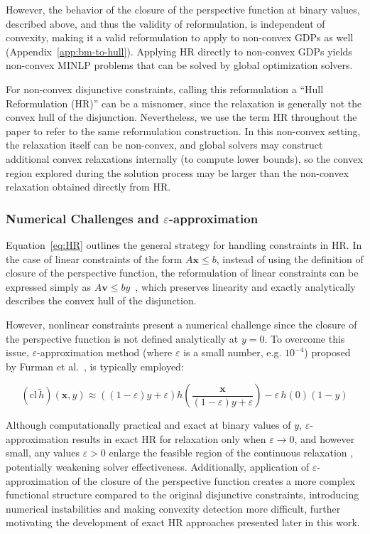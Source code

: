 \documentclass[11pt]{article}
\begin{document}
However, the behavior of the closure of the perspective function at binary values, described above, and thus the validity of reformulation, is independent of convexity, making it a valid reformulation to apply to non-convex GDPs as well (Appendix~\ref{app:bm-to-hull}).
Applying HR directly to non-convex GDPs yields non-convex MINLP problems that can be solved by global optimization solvers.


For non-convex disjunctive constraints, calling this reformulation a “Hull Reformulation (HR)” can be a misnomer, since the relaxation is generally not the convex hull of the disjunction.
Nevertheless, we use the term HR throughout the paper to refer to the same reformulation construction.
In this non-convex setting, the relaxation itself can be non-convex, and global solvers may construct additional convex relaxations internally (to compute lower bounds), so the convex region explored during the solution process may be larger than the non-convex relaxation obtained directly from HR.


\subsubsection{Numerical Challenges and $\varepsilon$-approximation}


Equation~\eqref{eq:HR} outlines the general strategy for handling constraints in HR.
In the case of linear constraints of the form \(A\mathbf{x}\leq b\), instead of using the definition of closure of the perspective function, the reformulation of linear constraints can be expressed simply as \(A\mathbf{v}\leq b y\)~\cite{balasDisjunctiveProgramming2018}, which preserves linearity and exactly analytically describes the convex hull of the disjunction.

However, nonlinear constraints present a numerical challenge since the closure of the perspective function is not defined analytically at \(y=0\).
To overcome this issue, \(\varepsilon\)-approximation method (where \(\varepsilon\) is a small number, e.g. \(10^{-4}\)) proposed by Furman et al.~\cite{furmanComputationallyUsefulAlgebraic2020}, is typically employed:

\begin{equation}
\left(\text{cl}\,\widetilde{h}\right)(\mathbf{x},y)\approx\left((1-\varepsilon)y+\varepsilon\right)h\left(\frac{\mathbf{x}}{(1-\varepsilon)y+\varepsilon}\right)-\varepsilon\,h(0)(1-y)
\label{eq:approx}
\end{equation}


Although computationally practical and exact at binary values of $y$, $\varepsilon$-approximation results in exact HR for relaxation only when \(\varepsilon\rightarrow0\), and however small, any values \(\varepsilon>0\) enlarge the feasible region of the continuous relaxation \cite{furmanComputationallyUsefulAlgebraic2020}, potentially weakening solver effectiveness.
Additionally, application of $\varepsilon$-approximation of the closure of the perspective function creates a more complex functional structure compared to the original disjunctive constraints, introducing numerical instabilities and making convexity detection more difficult, further motivating the development of exact HR approaches presented later in this work.
\end{document}
